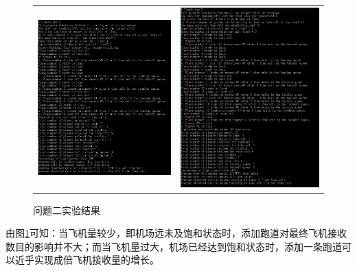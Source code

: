 \documentclass[12pt,UTF8]{ctexart}
\begin{document}
\begin{spacing}{1.4}
\begin{figure}[H]
	\centering
	\begin{tabular}{cc}
	\includegraphics[width=0.5\linewidth]{fig/exp_20.PNG} &
	\includegraphics[width=0.5\linewidth]{fig/exp_21.PNG}
	\end{tabular}
	\caption{问题二实验结果}
	\label{fig:2}
\end{figure}
由图\ref{fig:2}可知：当飞机量较少，即机场远未及饱和状态时，添加跑道对最终飞机接收数目的影响并不大；而当飞机量过大，机场已经达到饱和状态时，添加一条跑道可以近乎实现成倍飞机接收量的增长。


\end{spacing}
\end{document}
